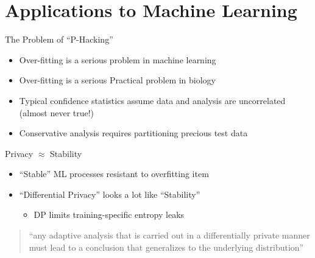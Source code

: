 \documentclass{beamer}
\begin{document}
\section{Applications to Machine Learning}

\begin{frame}{The Problem of ``P-Hacking''}
  \begin{itemize}
    \item Over-fitting is a serious problem in machine learning
    \item Over-fitting is a serious \alert{Practical} problem in biology
    \pause
    \item Typical confidence statistics assume data and analysis are uncorrelated (almost never true!)
    \item Conservative analysis requires partitioning precious test data
  \end{itemize}
\end{frame}
\begin{frame}{Privacy $\approx$ Stability}
  \begin{itemize}
    \item ``Stable'' ML processes resistant to overfitting item
    \item ``Differential Privacy'' looks a lot like ``Stability'' \begin{itemize}
      \item DP limits training-specific entropy leaks
    \end{itemize}
  \end{itemize}
\begin{quote}
  ``any adaptive analysis that is carried
out in a differentially private manner must lead to a conclusion
that generalizes to the underlying distribution''
\end{quote}
\end{frame}
\end{document}
